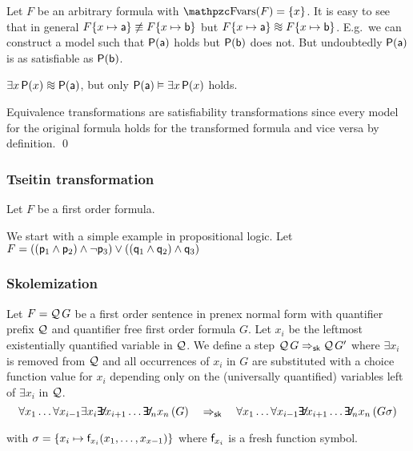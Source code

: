 \begin{example}
	Let \(F\) be an arbitrary formula with \( \fvar(F) = \{ x \} \).
	It is easy to see that in general
	\( F\{ x\mapsto\mathsf{a} \} \not\equiv F\{ x\mapsto\mathsf{b} \} \)
	but
	\( F\{ x\mapsto\ma \} \equisat F\{ x\mapsto\mb \} \).
	E.g.~we can construct a model such that
	\(\mathsf{P}(\mathsf{a})\) holds but \(\mathsf{P}(\mathsf{b})\) does not.
	But undoubtedly \(\mathsf{P}(\mathsf{a})\) is as satisfiable as
	 \(\mathsf{P}(\mathsf{b})\).
\end{example}

\begin{example}
	\( \exists x \, \mP(x) \equisat \mP(\ma) \), but only
	\( \mathsf{P}(\mathsf{a}) \vDash \exists x \, \mathsf{P}(x) \) holds.
\end{example}

\begin{lemma}
	Equivalence transformations are satisfiability transformations 
	since every model for the original formula holds for the transformed formula 
	and vice versa
	by definition. 
	\qed
\end{lemma}

\subsubsection{Tseitin transformation}

\begin{definition}\label{def:tseitin}
	Let \( F \) be a first order formula. 
\end{definition}

\begin{example}
	We start with a simple example in propositional logic.
	Let \( 
		F = ((\mathsf{p}_1 \land \mathsf{p}_2) \land \lnot\mathsf{p}_3) 
		\lor 
		((\mathsf{q}_1 \land \mathsf{q}_2) \land \mathsf{q}_3)
	\)
\end{example}

\subsubsection{Skolemization}

\begin{definition}\label{def:skolemization}
	Let \( F = \mathcal{Q}\,G \) be a first order sentence in prenex normal form
	with quantifier prefix \( \mathcal{Q} \) and quantifier free first order formula \( G \). 
	Let \( x_i \) be the leftmost existentially quantified variable in \( \mathcal{Q} \).
	We define a  step \( \mathcal{Q}\,G \Rightarrow_{\mathsf{sk}} \mathcal{Q}\,G' \)
	where \( \exists x_i \) is removed from \( \mathcal{Q} \)
	and
	all occurrences of \( x_i \) in \( G \) are substituted
	with a choice function value for \( x_i \) depending only
	on the (universally quantified) variables left of \( \exists x_i \) in \( \mathcal{Q} \).
	\[
		\forall x_1 \ldots \forall x_{i-1}
		\exists x_i 
		\quantify x_{i+1} \ldots \quantify_n x_n\, (G)
% 
		\quad \Rightarrow_{\mathsf {sk}} \quad
% 
		\forall x_1 \ldots \forall x_{i-1}
		\quantify x_{i+1} \ldots \quantify_n x_n\, (G\sigma)
	\]

	with \( \sigma = \{ x_i \mapsto \mathsf{f}_{x_i}(x_1,\ldots, x_{x-1}) \} \)
	where \( \mathsf{f}_{x_i} \) is a fresh function symbol.
\end{definition}

